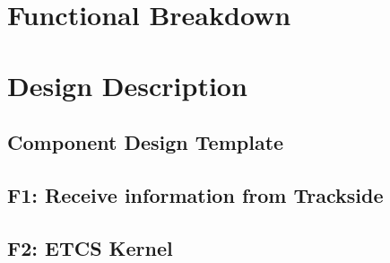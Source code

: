 \documentclass{template/openetcs_report}
\begin{document}
\chapter{Functional Breakdown}


\chapter{Design Description}

\section{Component Design Template}


\section{F1: Receive information from Trackside}

\section{F2: ETCS Kernel}







\end{document}
